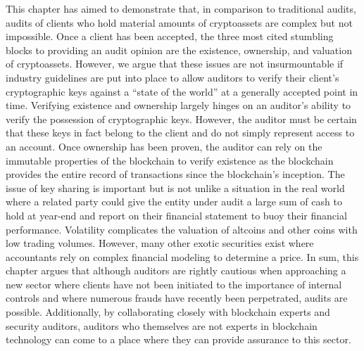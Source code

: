 This chapter has aimed to demonstrate that, in comparison to traditional audits, audits of clients who hold material amounts of cryptoassets are complex but not impossible. Once a client has been accepted, the three most cited stumbling blocks to providing an audit opinion are the existence, ownership, and valuation of cryptoassets. However, we argue that these issues are not insurmountable if industry guidelines are put into place to allow auditors to verify their client's cryptographic keys against a ``state of the world'' at a generally accepted point in time. Verifying existence and ownership largely hinges on an auditor's ability to verify the possession of cryptographic keys. However, the auditor must be certain that these keys in fact belong to the client and do not simply represent access to an account. Once ownership has been proven, the auditor can rely on the immutable properties of the blockchain to verify existence as the blockchain provides the entire record of transactions since the blockchain's inception. The issue of key sharing is important but is not unlike a situation in the real world where a related party could give the entity under audit a large sum of cash to hold at year-end and report on their financial statement to buoy their financial performance. Volatility complicates the valuation of altcoins and other coins with low trading volumes. However, many other exotic securities exist where accountants rely on complex financial modeling to determine a price.
In sum, this chapter argues that although auditors are rightly cautious when approaching a new sector where clients have not been initiated to the importance of internal controls and where numerous frauds have recently been perpetrated, audits are possible. Additionally, by collaborating closely with blockchain experts and security auditors, auditors who themselves are not experts in blockchain technology can come to a place where they can provide assurance to this sector.




